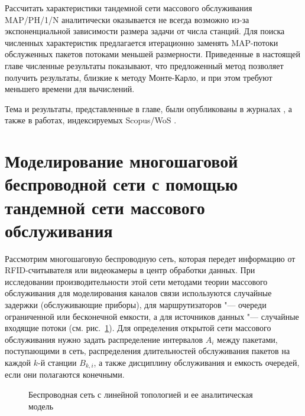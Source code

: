 Рассчитать характеристики тандемной сети массового обслуживания MAP/PH/1/N аналитически оказывается не всегда возможно из-за экспоненциальной зависимости размера задачи от числа станций. Для поиска численных характеристик предлагается итерационно заменять MAP-потоки обслуженных пакетов потоками меньшей размерности. Приведенные в настоящей главе численные результаты показывают, что предложенный метод позволяет получить результаты, близкие к методу Монте-Карло, и при этом требуют меньшего времени для вычислений.

Тема и результаты, представленные в главе, были опубликованы в журналах \cite{WINET_IJPAM2016, WINET_TCOMM2015, QS_JITCS2013, QS_JPU2013, QS_TCOMM2012}, а также в работах, индексируемых Scopus/WoS \cite{QS_ICAAPSP2020, QS_ITMM2019, QS_ITMM2017, QS_AICT2017, QS_ITMM2016, QS_DCCN2016_CCIS}.






\section{Моделирование многошаговой беспроводной сети с помощью тандемной сети массового обслуживания}\label{sec:ch4_wireless_network_model}

Рассмотрим многошаговую беспроводную сеть, которая передет информацию от RFID-считывателя или видеокамеры в центр обработки данных. При исследовании производительности этой сети методами теории массового обслуживания для моделирования каналов связи используются случайные задержки (обслуживающие приборы), для маршрутизаторов "--- очереди ограниченной или бесконечной емкости, а для источников данных "--- случайные входящие потоки (см. рис.~\ref{fig:ch4_network_model}). Для определения открытой сети массового обслуживания нужно задать распределение интервалов $A_i$ между пакетами, поступающими в сеть, распределения длительностей обслуживания пакетов на каждой $k$-й станции $B_{k,i}$, а также дисциплину обслуживания и емкость очередей, если они полагаются конечными.

\begin{figure}[h]
  \caption{Беспроводная сеть с линейной топологией и ее аналитическая модель}
  \label{fig:ch4_network_model}
\end{figure}

